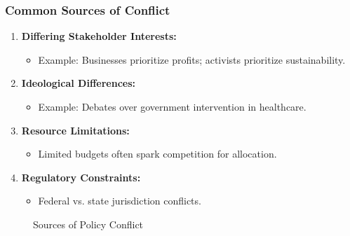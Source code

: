 \documentclass[10pt]{beamer}
\begin{document}
    \begin{frame}
    \frametitle{Common Sources of Conflict}
    \begin{enumerate}
        \item \textbf{Differing Stakeholder Interests:}
            \begin{itemize}
                \item Example: Businesses prioritize profits; activists prioritize sustainability.
            \end{itemize}
        \item \textbf{Ideological Differences:}
            \begin{itemize}
                \item Example: Debates over government intervention in healthcare.
            \end{itemize}
        \item \textbf{Resource Limitations:}
            \begin{itemize}
                \item Limited budgets often spark competition for allocation.
            \end{itemize}
        \item \textbf{Regulatory Constraints:}
            \begin{itemize}
                \item Federal vs. state jurisdiction conflicts.
            \end{itemize}
    \end{enumerate}
    
    \begin{figure}
        \centering
        \caption{Sources of Policy Conflict}
    \end{figure}
    \end{frame}
    
\end{document}
